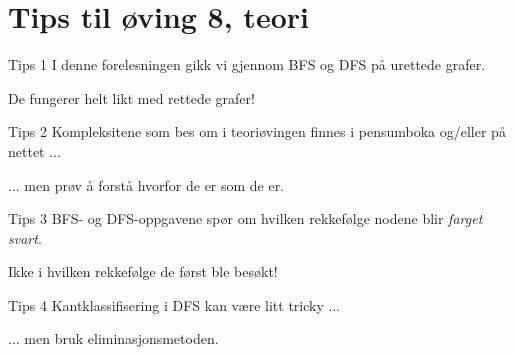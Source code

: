 \documentclass[14pt]{beamer}
\begin{document}
\section{Tips til øving 8, teori}
\begin{frame}{Tips 1}
    I denne forelesningen gikk vi gjennom BFS og DFS på urettede grafer.

    \pause

    De fungerer helt likt med rettede grafer!
\end{frame}
\begin{frame}{Tips 2}
    Kompleksitene som bes om i teoriøvingen finnes i pensumboka og/eller på nettet ...

    \pause

    ... men prøv å forstå hvorfor de er som de er.
\end{frame}
\begin{frame}{Tips 3}
    BFS- og DFS-oppgavene spør om hvilken rekkefølge nodene blir \textit{farget svart}.

    \pause

    Ikke i hvilken rekkefølge de først ble besøkt!
\end{frame}
\begin{frame}{Tips 4}
    Kantklassifisering i DFS kan være litt tricky ...

    \pause

    ... men bruk eliminasjonsmetoden.
\end{frame}
\end{document}
